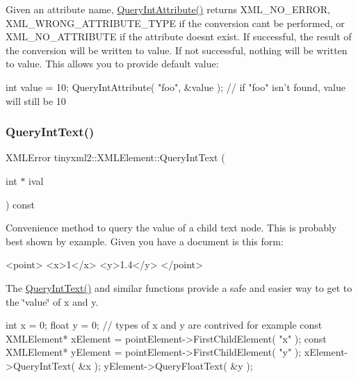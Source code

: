 Given an attribute name, \hyperlink{classtinyxml2_1_1XMLElement_a8a78bc1187c1c45ad89f2690eab567b1}{Query\+Int\+Attribute()} returns X\+M\+L\+\_\+\+N\+O\+\_\+\+E\+R\+R\+OR, X\+M\+L\+\_\+\+W\+R\+O\+N\+G\+\_\+\+A\+T\+T\+R\+I\+B\+U\+T\+E\+\_\+\+T\+Y\+PE if the conversion can\textquotesingle{}t be performed, or X\+M\+L\+\_\+\+N\+O\+\_\+\+A\+T\+T\+R\+I\+B\+U\+TE if the attribute doesn\textquotesingle{}t exist. If successful, the result of the conversion will be written to \textquotesingle{}value\textquotesingle{}. If not successful, nothing will be written to \textquotesingle{}value\textquotesingle{}. This allows you to provide default value\+:

\begin{DoxyVerb}int value = 10;
QueryIntAttribute( "foo", &value );     // if "foo" isn't found, value will still be 10
\end{DoxyVerb}
 \mbox{\label{classtinyxml2_1_1XMLElement_a926357996bef633cb736e1a558419632}} 
\subsubsection{\texorpdfstring{Query\+Int\+Text()}{QueryIntText()}\hspace{0.1cm}{\footnotesize\ttfamily [1/2]}}
{\footnotesize\ttfamily X\+M\+L\+Error tinyxml2\+::\+X\+M\+L\+Element\+::\+Query\+Int\+Text (\begin{DoxyParamCaption}\item[{int $\ast$}]{ival }\end{DoxyParamCaption}) const}

Convenience method to query the value of a child text node. This is probably best shown by example. Given you have a document is this form\+: \begin{DoxyVerb}    <point>
        <x>1</x>
        <y>1.4</y>
    </point>
\end{DoxyVerb}


The \hyperlink{classtinyxml2_1_1XMLElement_a926357996bef633cb736e1a558419632}{Query\+Int\+Text()} and similar functions provide a safe and easier way to get to the \char`\"{}value\char`\"{} of x and y.

\begin{DoxyVerb}    int x = 0;
    float y = 0;    // types of x and y are contrived for example
    const XMLElement* xElement = pointElement->FirstChildElement( "x" );
    const XMLElement* yElement = pointElement->FirstChildElement( "y" );
    xElement->QueryIntText( &x );
    yElement->QueryFloatText( &y );
\end{DoxyVerb}


